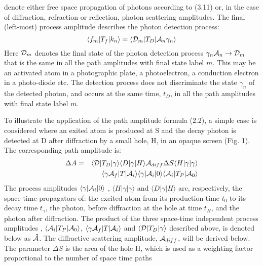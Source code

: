 {  denote either free space propagation of photons according to (3.11) or, in the case of
  diffraction, refraction or reflection, photon scattering amplitudes. The final (left-most)
  process amplitude describes the photon detection process:
   \begin{equation}
  \langle f_m|T_f|k_{n}\rangle =  \langle {\cal D}_m|T_D| {\cal A}_n \gamma_n \rangle 
  \end{equation}
   Here ${\cal D}_m$ denotes the final state of the photon detection process
   $\gamma_n {\cal A}_n \rightarrow {\cal D}_m$ that is the same in all the path amplitudes
   with final state label $m$. This may be an activated atom in a photographic plate,
   a photoelectron, a conduction electron in a photo-diode etc. The detection process
   does not discriminate the state $\gamma_n$ of the detected photon, and 
   occurs at the same time, $t_D$, in all the path amplitudes with final state 
   label $m$.
   \par To illustrate the application of the path amplitude formula (2.2), a simple case
    is considered where an exited atom is produced at S and the decay photon is detected at D after
    diffraction by a small hole, H, in an opaque screen (Fig. 1). The corresponding 
    path amplitude is:
   \begin{eqnarray}
   \Delta A & = & \langle {\cal D}|T_D| \gamma \rangle
               \langle D|\gamma|H\rangle {\cal A}_{diff}\Delta S
              \langle H|\gamma|\gamma\rangle \nonumber \\
           &   &    \langle \gamma  {\cal A}_f|T| {\cal A}_i\rangle
                \langle\gamma |{\cal A}_i| 0\rangle 
                \langle {\cal A}_i|T_P|{\cal A}_0 \rangle
     \end{eqnarray}
 The process amplitudes $\langle\gamma |{\cal A}_i|0 \rangle$ , 
 $\langle H|\gamma|\gamma \rangle$ and 
 $\langle D|\gamma|H \rangle$ are, respectively, the space-time
  propagators of: the excited atom from its production time $t_0$
  to its decay time $t_{\gamma}$, the photon, before diffraction at the hole at time $t_H$,
  and the photon
  after diffraction. The product of the three space-time independent process
 amplitudes , $\langle {\cal A}_i|T_P|{\cal A}_0 \rangle$, $\langle \gamma  {\cal A}_f|T| {\cal A}_i\rangle$
  and $\langle {\cal D}|T_D| \gamma \rangle$ described above, is denoted below as $\tilde{{\cal A}}$.
   The diffractive scattering
  amplitude, $ {\cal A}_{diff}$, will be derived below. The parameter $\Delta S$ is the area of the hole 
  H, which is used as a weighting factor proportional to the number of space time paths 
}
